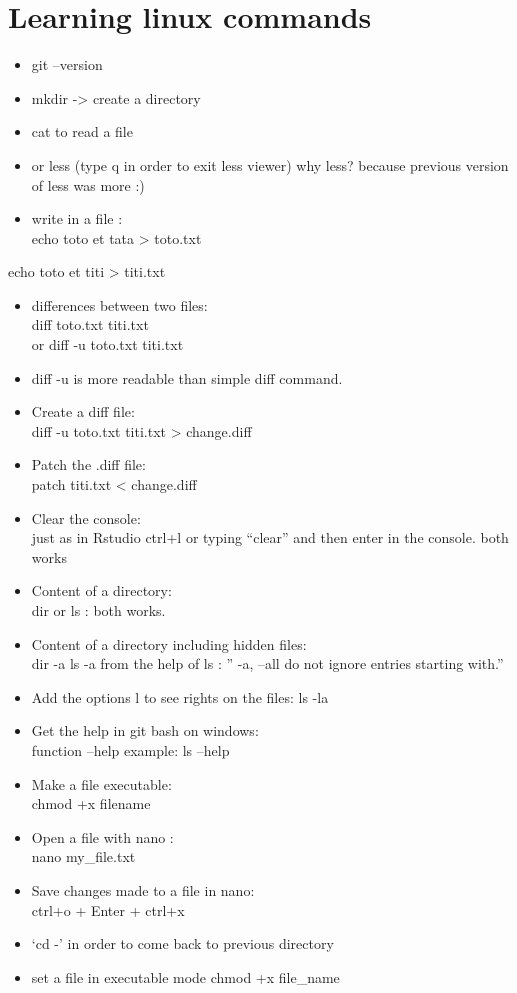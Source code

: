 \documentclass[
]{book}
\begin{document}
\hypertarget{learning-linux-commands}{%
\chapter{Learning linux commands}\label{learning-linux-commands}}

\begin{itemize}
\item
  git --version
\item
  mkdir -\textgreater{} create a directory
\item
  cat to read a file
\item
  or less (type q in order to exit less viewer)
  why less? because previous version of less was more :)
\item
  write in a file :\\
  echo toto et tata \textgreater{} toto.txt
\end{itemize}

echo toto et titi \textgreater{} titi.txt

\begin{itemize}
\item
  differences between two files:\\
  diff toto.txt titi.txt\\
  or diff -u toto.txt titi.txt
\item
  diff -u is more readable than simple diff command.
\item
  Create a diff file:\\
  diff -u toto.txt titi.txt \textgreater{} change.diff
\item
  Patch the .diff file:\\
  patch titi.txt \textless{} change.diff
\item
  Clear the console:\\
  just as in Rstudio ctrl+l
  or typing ``clear'' and then enter in the console.
  both works
\item
  Content of a directory:\\
  dir or ls : both works.
\item
  Content of a directory including hidden files:\\
  dir -a
  ls -a
  from the help of ls : '' -a, --all do not ignore entries starting with.''
\item
  Add the options l to see rights on the files:
  ls -la
\item
  Get the help in git bash on windows:\\
  function --help
  example: ls --help
\item
  Make a file executable:\\
  chmod +x filename
\item
  Open a file with nano :\\
  nano my\_file.txt
\item
  Save changes made to a file in nano:\\
  ctrl+o + Enter + ctrl+x
\item
  `cd -' in order to come back to previous directory
\item
  set a file in executable mode
  chmod +x file\_name
\end{itemize}
\end{document}
